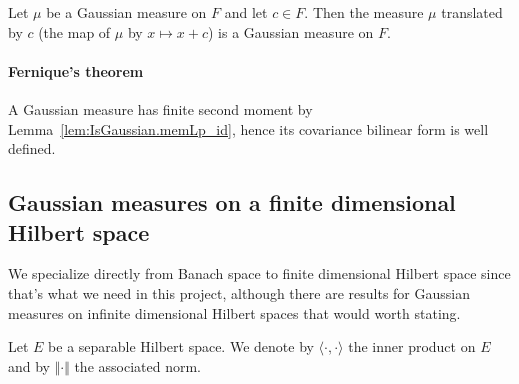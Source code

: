 \begin{lemma}\label{lem:isGaussian_add_const}
  \leanok
Let $\mu$ be a Gaussian measure on $F$ and let $c \in F$.
Then the measure $\mu$ translated by $c$ (the map of $\mu$ by $x \mapsto x + c$) is a Gaussian measure on $F$.
\end{lemma}









\paragraph{Fernique's theorem}

















A Gaussian measure has finite second moment by Lemma~\ref{lem:IsGaussian.memLp_id}, hence its covariance bilinear form is well defined.


\subsection{Gaussian measures on a finite dimensional Hilbert space}

We specialize directly from Banach space to finite dimensional Hilbert space since that's what we need in this project, although there are results for Gaussian measures on infinite dimensional Hilbert spaces that would worth stating.




Let $E$ be a separable Hilbert space. We denote by $\langle \cdot, \cdot \rangle$ the inner product on $E$ and by $\Vert \cdot \Vert$ the associated norm.




